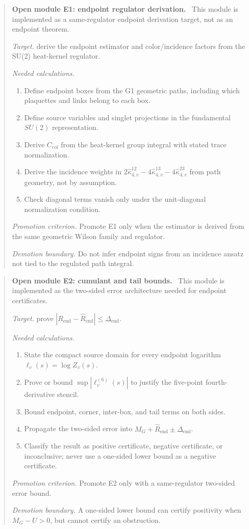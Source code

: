 \documentclass[11pt]{article}
\newenvironment{openmodule}[1]
{\begin{quote}\color{red!55!black}\textbf{Open module #1.}\ }
{\end{quote}}
\begin{document}
\begin{openmodule}{E1: endpoint regulator derivation}
This module is implemented as a same-regulator endpoint derivation target, not as an endpoint theorem.

\emph{Target.} derive the endpoint estimator and color/incidence factors from the SU(2) heat-kernel regulator.

\emph{Needed calculations.}
\begin{enumerate}[label=(\alph*)]
  \item Define endpoint boxes from the G1 geometric paths, including which plaquettes and links belong to each box.
  \item Define source variables and singlet projections in the fundamental \(SU(2)\) representation.
  \item Derive \(C_{\mathrm{col}}\) from the heat-kernel group integral with stated trace normalization.
  \item Derive the incidence weights in \(2\widehat\kappa^{12}_{4,v}-4\widehat\kappa^{13}_{4,v}-4\widehat\kappa^{23}_{4,v}\) from path geometry, not by assumption.
  \item Check diagonal terms vanish only under the unit-diagonal normalization condition.
\end{enumerate}

\emph{Promotion criterion.} Promote E1 only when the estimator is derived from the same geometric Wilson family and regulator.

\emph{Demotion boundary.} Do not infer endpoint signs from an incidence ansatz not tied to the regulated path integral.
\end{openmodule}

\begin{openmodule}{E2: cumulant and tail bounds}
This module is implemented as the two-sided error architecture needed for endpoint certificates.

\emph{Target.} prove \(|R_{\mathrm{end}}-\widehat R_{\mathrm{end}}|\le\Delta_{\mathrm{end}}\).

\emph{Needed calculations.}
\begin{enumerate}[label=(\alph*)]
  \item State the compact source domain for every endpoint logarithm \(\ell_v(s)=\log Z_v(s)\).
  \item Prove or bound \(\sup|\ell_v^{(6)}(s)|\) to justify the five-point fourth-derivative stencil.
  \item Bound endpoint, corner, inter-box, and tail terms on both sides.
  \item Propagate the two-sided error into \(M_G+\widehat R_{\mathrm{end}}\pm\Delta_{\mathrm{end}}\).
  \item Classify the result as positive certificate, negative certificate, or inconclusive; never use a one-sided lower bound as a negative certificate.
\end{enumerate}

\emph{Promotion criterion.} Promote E2 only with a same-regulator two-sided error bound.

\emph{Demotion boundary.} A one-sided lower bound can certify positivity when \(M_G-U>0\), but cannot certify an obstruction.
\end{openmodule}
\end{document}
